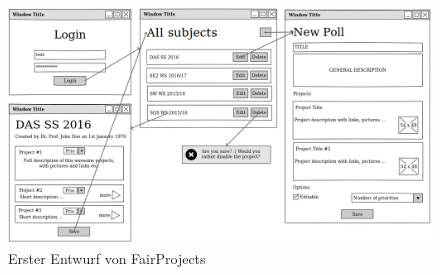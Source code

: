\begin{figure}[t]
	\centering
	\includegraphics[width=0.7\linewidth]{figures/fairprojectsFirstDraft.png}
	\caption{Erster Entwurf von FairProjects}
	\label{f:fallstudie:firstdraft}
\end{figure}